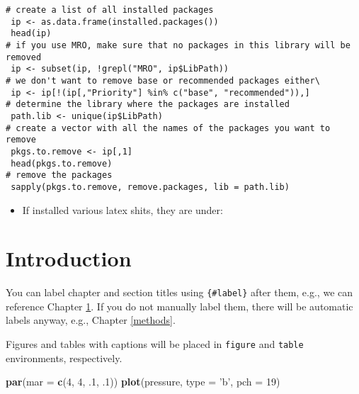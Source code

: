 \documentclass[]{book}
\newenvironment{Shaded}{\begin{snugshade}}{\end{snugshade}}
\newcommand{\KeywordTok}[1]{\textcolor[rgb]{0.13,0.29,0.53}{\textbf{#1}}}
\newcommand{\DataTypeTok}[1]{\textcolor[rgb]{0.13,0.29,0.53}{#1}}
\newcommand{\DecValTok}[1]{\textcolor[rgb]{0.00,0.00,0.81}{#1}}
\newcommand{\FloatTok}[1]{\textcolor[rgb]{0.00,0.00,0.81}{#1}}
\newcommand{\StringTok}[1]{\textcolor[rgb]{0.31,0.60,0.02}{#1}}
\newcommand{\OperatorTok}[1]{\textcolor[rgb]{0.81,0.36,0.00}{\textbf{#1}}}
\newcommand{\NormalTok}[1]{#1}
\providecommand{\tightlist}{%
  \setlength{\itemsep}{0pt}\setlength{\parskip}{0pt}}
\theoremstyle{definition}
\theoremstyle{definition}
\theoremstyle{definition}
\theoremstyle{remark}
\begin{document}
\begin{verbatim}
# create a list of all installed packages
 ip <- as.data.frame(installed.packages())
 head(ip)
# if you use MRO, make sure that no packages in this library will be removed
 ip <- subset(ip, !grepl("MRO", ip$LibPath))
# we don't want to remove base or recommended packages either\
 ip <- ip[!(ip[,"Priority"] %in% c("base", "recommended")),]
# determine the library where the packages are installed
 path.lib <- unique(ip$LibPath)
# create a vector with all the names of the packages you want to remove
 pkgs.to.remove <- ip[,1]
 head(pkgs.to.remove)
# remove the packages
 sapply(pkgs.to.remove, remove.packages, lib = path.lib)
\end{verbatim}

\begin{itemize}
\tightlist
\item
  If installed various latex shits, they are under:
\end{itemize}

\begin{Shaded}
\end{Shaded}

\chapter{Introduction}\label{intro}

You can label chapter and section titles using \texttt{\{\#label\}}
after them, e.g., we can reference Chapter \ref{intro}. If you do not
manually label them, there will be automatic labels anyway, e.g.,
Chapter \ref{methods}.

Figures and tables with captions will be placed in \texttt{figure} and
\texttt{table} environments, respectively.

\begin{Shaded}
\begin{Highlighting}[]
\KeywordTok{par}\NormalTok{(}\DataTypeTok{mar =} \KeywordTok{c}\NormalTok{(}\DecValTok{4}\NormalTok{, }\DecValTok{4}\NormalTok{, .}\DecValTok{1}\NormalTok{, .}\DecValTok{1}\NormalTok{))}
\KeywordTok{plot}\NormalTok{(pressure, }\DataTypeTok{type =} \StringTok{'b'}\NormalTok{, }\DataTypeTok{pch =} \DecValTok{19}\NormalTok{)}
\end{Highlighting}
\end{Shaded}
\end{document}
